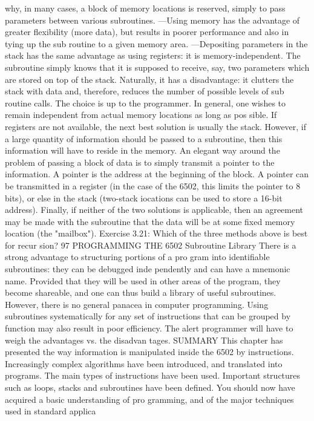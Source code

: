 \documentclass{book}
\begin{document}
why, in many cases, a block of memory locations is reserved,
simply to pass parameters between various subroutines.
—Using memory has the advantage of greater flexibility (more data),
but results in poorer performance and also in tying up the sub
routine to a given memory area.
—Depositing parameters in the stack has the same advantage as using
registers: it is memory-independent. The subroutine simply knows that
it is supposed to receive, say, two parameters which are stored on top
of the stack. Naturally, it has a disadvantage: it clutters the stack with
data and, therefore, reduces the number of possible levels of sub
routine calls.
The choice is up to the programmer. In general, one wishes to
remain independent from actual memory locations as long as pos
sible.
If registers are not available, the next best solution is usually
the stack. However, if a large quantity of information should be
passed to a subroutine, then this information will have to reside
in the memory. An elegant way around the problem of passing a
block of data is to simply transmit a pointer to the information. A
pointer is the address at the beginning of the block. A pointer can
be transmitted in a register (in the case of the 6502, this limits
the pointer to 8 bits), or else in the stack (two-stack iocations can
be used to store a 16-bit address).
Finally, if neither of the two solutions is applicable, then an
agreement may be made with the subroutine that the data will be
at some fixed memory location (the "mailbox").
Exercise 3.21: Which of the three methods above is best for recur
sion?
97
PROGRAMMING THE 6502
Subroutine Library
There is a strong advantage to structuring portions of a pro
gram into identifiable subroutines: they can be debugged inde
pendently and can have a mnemonic name. Provided that they
will be used in other areas of the program, they become shareable,
and one can thus build a library of useful subroutines. However,
there is no general panacea in computer programming. Using
subroutines systematically for any set of instructions that can be
grouped by function may also result in poor efficiency. The alert
programmer will have to weigh the advantages vs. the disadvan
tages.
SUMMARY
This chapter has presented the way information is manipulated
inside the 6502 by instructions. Increasingly complex algorithms
have been introduced, and translated into programs. The main
types of instructions have been used.
Important structures such as loops, stacks and subroutines
have been defined.
You should now have acquired a basic understanding of pro
gramming, and of the major techniques used in standard applica
\end{document}
